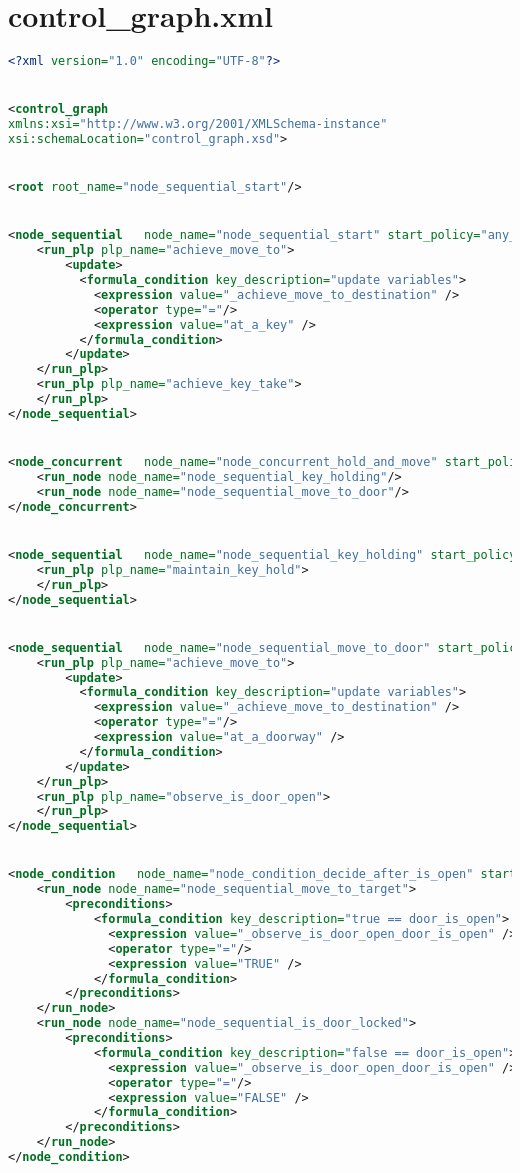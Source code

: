 \section{  control_graph.xml}\label{Appendix_3_1} 
\begin{lstlisting}[style=stylexml,language=XML]
<?xml version="1.0" encoding="UTF-8"?>


<control_graph
xmlns:xsi="http://www.w3.org/2001/XMLSchema-instance"
xsi:schemaLocation="control_graph.xsd">


<root root_name="node_sequential_start"/>


<node_sequential   node_name="node_sequential_start" start_policy="any_predecessor_done" next_node_name="node_concurrent_hold_and_move">
    <run_plp plp_name="achieve_move_to">
        <update>
          <formula_condition key_description="update variables">
            <expression value="_achieve_move_to_destination" />
            <operator type="="/>
            <expression value="at_a_key" />
          </formula_condition>
        </update>
    </run_plp>
    <run_plp plp_name="achieve_key_take">
    </run_plp>
</node_sequential>


<node_concurrent   node_name="node_concurrent_hold_and_move" start_policy="any_predecessor_done">
    <run_node node_name="node_sequential_key_holding"/>
    <run_node node_name="node_sequential_move_to_door"/>
</node_concurrent>


<node_sequential   node_name="node_sequential_key_holding" start_policy="any_predecessor_done" next_node_name="">
    <run_plp plp_name="maintain_key_hold">
    </run_plp>
</node_sequential>


<node_sequential   node_name="node_sequential_move_to_door" start_policy="any_predecessor_done" next_node_name="node_condition_decide_after_is_open">
    <run_plp plp_name="achieve_move_to">
        <update>
          <formula_condition key_description="update variables">
            <expression value="_achieve_move_to_destination" />
            <operator type="="/>
            <expression value="at_a_doorway" />
          </formula_condition>
        </update>
    </run_plp>
    <run_plp plp_name="observe_is_door_open">
    </run_plp>
</node_sequential>


<node_condition   node_name="node_condition_decide_after_is_open" start_policy="any_predecessor_done">
    <run_node node_name="node_sequential_move_to_target">
        <preconditions>
            <formula_condition key_description="true == door_is_open">
              <expression value="_observe_is_door_open_door_is_open" />
              <operator type="="/>
              <expression value="TRUE" />
            </formula_condition>
        </preconditions>
    </run_node>
    <run_node node_name="node_sequential_is_door_locked">
        <preconditions>
            <formula_condition key_description="false == door_is_open">
              <expression value="_observe_is_door_open_door_is_open" />
              <operator type="="/>
              <expression value="FALSE" />
            </formula_condition>
        </preconditions>
    </run_node>
</node_condition>



\end{lstlisting}
